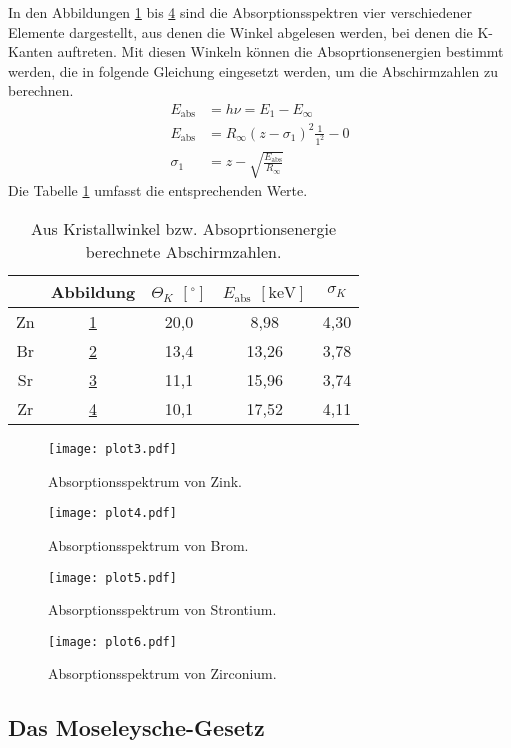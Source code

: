 In den Abbildungen \ref{fig:plot3} bis \ref{fig:plot6} sind die Absorptionsspektren vier verschiedener Elemente dargestellt,
aus denen die Winkel abgelesen werden, bei denen die K-Kanten auftreten.
Mit diesen Winkeln können die Absoprtionsenergien bestimmt werden, die in folgende Gleichung eingesetzt werden, um die Abschirmzahlen zu berechnen.
\begin{align*}
   E_\text{abs} &= h\nu = E_1 - E_\infty \\
   E_\text{abs} &= R_\infty (z-\sigma_1)^2 \frac{1}{1^2} - 0 \\
   \sigma_1 &= z - \sqrt{\frac{E_\text{abs}}{R_\infty}}
\end{align*}
Die Tabelle \ref{tab:abs} umfasst die entsprechenden Werte.
\begin{table}
  \centering
  \caption{Aus Kristallwinkel bzw. Absoprtionsenergie berechnete Abschirmzahlen.}
  \label{tab:abs}
  \begin{tabular}{c c c c c}
    \toprule
    & Abbildung & $\Theta_K$ $[^\circ]$ & $E_\text{abs}$ $[\si{\kilo\eV}]$ & $\sigma_K$\\
    \midrule
    Zn & \ref{fig:plot3} & 20,0 & 8,98 & 4,30 \\
    Br & \ref{fig:plot4} & 13,4 & 13,26 & 3,78 \\
    Sr & \ref{fig:plot5} & 11,1 & 15,96 & 3,74 \\
    Zr & \ref{fig:plot6} & 10,1 & 17,52 & 4,11 \\
    \bottomrule
  \end{tabular}
\end{table}
\FloatBarrier
\begin{figure}
  \centering
  \texttt{[image: plot3.pdf]}
  \caption{Absorptionsspektrum von Zink.}
  \label{fig:plot3}
\end{figure}
\begin{figure}
  \centering
  \texttt{[image: plot4.pdf]}
  \caption{Absorptionsspektrum von Brom.}
  \label{fig:plot4}
\end{figure}
\begin{figure}
  \centering
  \texttt{[image: plot5.pdf]}
  \caption{Absorptionsspektrum von Strontium.}
  \label{fig:plot5}
\end{figure}
\begin{figure}
  \centering
  \texttt{[image: plot6.pdf]}
  \caption{Absorptionsspektrum von Zirconium.}
  \label{fig:plot6}
\end{figure}
\FloatBarrier

\subsection{Das Moseleysche-Gesetz}

